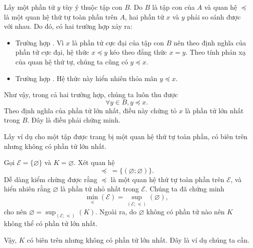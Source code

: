 Lấy một phần tử $y$ tùy ý thuộc tập con $B$. Do $B$ là tập con của $A$ và quan hệ $\preccurlyeq$ là một quan hệ thứ tự toàn phần trên $A$, hai phần tử $x$ và $y$ phải so sánh được với nhau. Do đó, có hai trường hợp xảy ra:
\begin{itemize}
   \item Trường hợp . Vì $x$ là phần tử cực đại của tập con $B$ nên theo định nghĩa của phần tử cực đại, hệ thức $x \preccurlyeq y$ kéo theo đẳng thức $x = y$. Theo tính phản xạ của quan hệ thứ tự, chúng ta cũng có $y \preccurlyeq x$.
   
   \item Trường hợp . Hệ thức này hiển nhiên thỏa mãn $y \preccurlyeq x$.
\end{itemize}
Như vậy, trong cả hai trường hợp, chúng ta luôn thu được
$$
\forall y \in B, y \preccurlyeq x.
$$
Theo định nghĩa của phần tử lớn nhất, điều này chứng tỏ $x$ là phần tử lớn nhất trong $B$. Đây là điều phải chứng minh.

\exercise Lấy ví dụ cho một tập được trang bị một quan hệ thứ tự toàn phần, có biên trên nhưng không có phần tử lớn nhất.

\solution

Gọi $\mathscr{E} = \{\varnothing\}$ và $K = \varnothing$. Xét quan hệ
\begin{equation*}
   \preccurlyeq\;=\{(\varnothing; \varnothing)\}.
\end{equation*}
Dễ dàng kiểm chứng được rằng $\preccurlyeq$ là một quan hệ thứ tự toàn phần trên $\mathscr{E}$, và hiển nhiên rằng $\varnothing$ là phần tử nhỏ nhất trong $\mathscr{E}$. Chúng ta đã chứng minh
\begin{equation*}
   \min_{\preccurlyeq} (\mathscr{E}) = \sup_{(\mathscr{E}; \preccurlyeq)} (\varnothing),
\end{equation*}
cho nên $\varnothing = \sup_{(\mathscr{E}; \preccurlyeq)} (K)$. Ngoài ra, do $\varnothing$ không có phần tử nào nên $K$  không thể có phần tử lớn nhất.

Vậy, $K$ có biên trên nhưng không có phần tử lớn nhất. Đây là ví dụ chúng ta cần.
